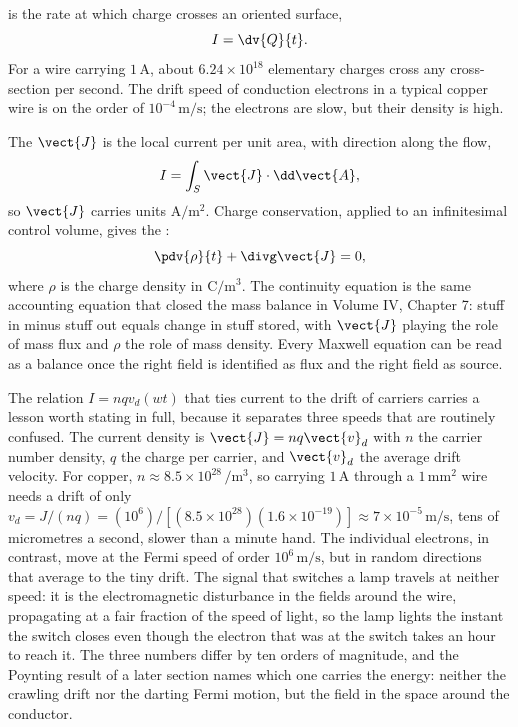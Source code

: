  is the rate at which charge crosses an oriented
surface,
\[
I = \dv{Q}{t}.
\]
For a wire carrying $1\,\si{\ampere}$, about $6.24\times 10^{18}$
elementary charges cross any cross-section per second. The drift speed
of conduction electrons in a typical copper wire is on the order of
$10^{-4}\,\si{\meter\per\second}$; the electrons are slow, but their
density is high.

The  $\vect{J}$ is the local current per unit
area, with direction along the flow,
\[
I = \int_{S} \vect{J}\cdot \dd\vect{A},
\]
so $\vect{J}$ carries units $\si{\ampere\per\meter\squared}$. Charge
conservation, applied to an infinitesimal control volume, gives the
:
\[
\pdv{\rho}{t} + \divg \vect{J} = 0,
\]
where $\rho$ is the charge density in $\si{\coulomb\per\meter\cubed}$.
The continuity equation is the same accounting equation that closed the
mass balance in Volume IV, Chapter 7: stuff in minus stuff out equals
change in stuff stored, with $\vect{J}$ playing the role of mass flux
and $\rho$ the role of mass density. Every Maxwell equation can be read
as a balance once the right field is identified as flux and the right
field as source.

The relation $I = n q v_d (w t)$ that ties current to the drift of carriers
carries a lesson worth stating in full, because it separates three speeds
that are routinely confused. The current density is $\vect{J} = n q\vect{v}_d$
with $n$ the carrier number density, $q$ the charge per carrier, and
$\vect{v}_d$ the average drift velocity. For copper, $n \approx 8.5\times
10^{28}\,\si{\per\meter\cubed}$, so carrying $1\,\si{\ampere}$ through a
$1\,\si{\milli\meter\squared}$ wire needs a drift of only $v_d = J/(nq) =
(10^{6})/[(8.5\times 10^{28})(1.6\times 10^{-19})] \approx 7\times 10^{-5}\,
\si{\meter\per\second}$, tens of micrometres a second, slower than a
minute hand. The individual electrons, in contrast, move at the Fermi speed
of order $10^{6}\,\si{\meter\per\second}$, but in random directions that
average to the tiny drift. The signal that switches a lamp travels at neither
speed: it is the electromagnetic disturbance in the fields around the wire,
propagating at a fair fraction of the speed of light, so the lamp lights the
instant the switch closes even though the electron that was at the switch
takes an hour to reach it. The three numbers differ by ten orders of
magnitude, and the Poynting result of a later section names which one carries
the energy: neither the crawling drift nor the darting Fermi motion, but the
field in the space around the conductor.

